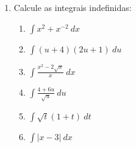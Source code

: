 \documentclass[a4paper,5pt]{amsbook}
\newcommand{\ds}{\displaystyle}
\begin{document}
\begin{enumerate}
    \vspace{0.5cm}
    \item Calcule as integrais indefinidas:
    \begin{enumerate}
        \item $\ds\int x^2+x^{-2}\ dx$
        \vspace{0.3cm}
        \item $\ds\int (u+4)(2u+1)\ du$
        \vspace{0.3cm}
        \item $\ds\int \frac{x^2-2\sqrt{x}}{x}\ dx$
        \vspace{0.3cm}
        \item $\ds\int \frac{4+6u}{\sqrt{u}}\ du$
        \vspace{0.3cm}
        \item $\ds\int \sqrt{t}(1+t)\ dt$
        \vspace{0.3cm}
        \item $\ds\int |x-3|\ dx$
    \end{enumerate}
\end{enumerate}
\end{document}
